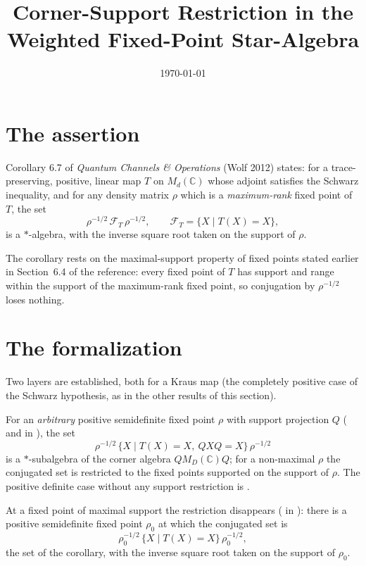 \documentclass[11pt]{article}
\title{Corner-Support Restriction in the Weighted Fixed-Point Star-Algebra}
\author{}
\date{\today}
\begin{document}
\maketitle
{}

\section{The assertion}

Corollary 6.7 of \emph{Quantum Channels \& Operations} (Wolf 2012) states: for a
trace-preserving, positive, linear map $T$ on $M_d(\mathbb{C})$ whose adjoint satisfies
the Schwarz inequality, and for any density matrix $\rho$ which is a \emph{maximum-rank}
fixed point of $T$, the set
\[
    \rho^{-1/2}\,\mathcal{F}_T\,\rho^{-1/2},
    \qquad \mathcal{F}_T = \{X \mid T(X) = X\},
\]
is a $*$-algebra, with the inverse square root taken on the support of $\rho$.

The corollary rests on the maximal-support property of fixed points stated earlier in
Section~6.4 of the reference: every fixed point of $T$ has support and range within the
support of the maximum-rank fixed point, so conjugation by $\rho^{-1/2}$ loses nothing.

\section{The formalization}

Two layers are established, both for a Kraus map (the completely positive case of the
Schwarz hypothesis, as in the other results of this section).

For an \emph{arbitrary} positive semidefinite fixed point $\rho$ with support
projection $Q$ ( and
 in
), the set
\[
    \rho^{-1/2}\,\{X \mid T(X) = X,\ Q X Q = X\}\,\rho^{-1/2}
\]
is a $*$-subalgebra of the corner algebra $Q M_D(\mathbb{C}) Q$; for a non-maximal
$\rho$ the conjugated set is restricted to the fixed points supported on the support
of $\rho$. The positive definite case without any support restriction is
.

At a fixed point of maximal support the restriction disappears
( in
): there is a positive
semidefinite fixed point $\rho_0$ at which the conjugated set is
\[
    \rho_0^{-1/2}\,\{X \mid T(X) = X\}\,\rho_0^{-1/2},
\]
the set of the corollary, with the inverse square root taken on the support of
$\rho_0$.
\end{document}
